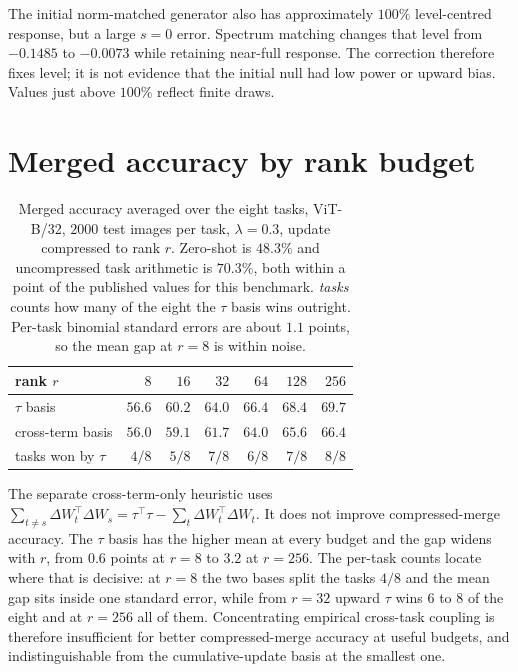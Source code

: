 The initial norm-matched generator also has approximately $100\%$ level-centred response, but a
large $s=0$ error. Spectrum matching changes that level from $-0.1485$ to $-0.0073$ while
retaining near-full response. The correction therefore fixes level; it is not evidence that the
initial null had low power or upward bias. Values just above $100\%$ reflect finite draws.

\section{Merged accuracy by rank budget}
\label{app:merge}

\begin{table}[h]
\centering
\caption{Merged accuracy averaged over the eight tasks, ViT-B/32, $2000$ test images per task,
$\lambda=0.3$, update compressed to rank $r$. Zero-shot is $48.3\%$ and uncompressed task
arithmetic is $70.3\%$, both within a point of the published values for this benchmark.
\emph{tasks} counts how many of the eight the $\tau$ basis wins outright. Per-task binomial
standard errors are about $1.1$ points, so the mean gap at $r=8$ is within noise.}
\label{tab:merge}
\begin{tabular}{@{}lrrrrrr@{}}
\toprule
rank $r$ & $8$ & $16$ & $32$ & $64$ & $128$ & $256$ \\
\midrule
$\tau$ basis        & $56.6$ & $60.2$ & $64.0$ & $66.4$ & $68.4$ & $69.7$ \\
cross-term basis    & $56.0$ & $59.1$ & $61.7$ & $64.0$ & $65.6$ & $66.4$ \\
\midrule
tasks won by $\tau$ & $4/8$ & $5/8$ & $7/8$ & $6/8$ & $7/8$ & $8/8$ \\
\bottomrule
\end{tabular}
\end{table}

The separate cross-term-only heuristic uses
$\sum_{t\ne s}\Delta W_t^\top\Delta W_s=\tau^\top\tau-
\sum_t\Delta W_t^\top\Delta W_t$. It does not improve compressed-merge accuracy. The $\tau$ basis
has the higher mean at every budget and the gap widens with $r$, from $0.6$ points at $r=8$ to
$3.2$ at $r=256$. The per-task counts locate where that is decisive: at $r=8$ the two bases split
the tasks $4/8$ and the mean gap sits inside one standard error, while from $r=32$ upward $\tau$
wins $6$ to $8$ of the eight and at $r=256$ all of them. Concentrating empirical cross-task
coupling is therefore insufficient for better compressed-merge accuracy at useful budgets, and
indistinguishable from the cumulative-update basis at the smallest one.


